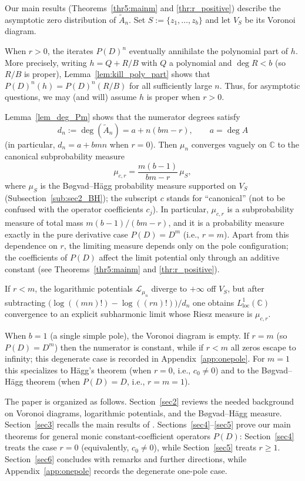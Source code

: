 \documentclass[12pt]{article}
\theoremstyle{plain}
\theoremstyle{definition}
\begin{document}
Our main results (Theorems~\ref{thr5:mainm} and \ref{thr:r_positive}) describe the asymptotic zero distribution of $\widetilde A_n$.
Set $S:=\{z_1,\dots,z_b\}$ and let $V_S$ be its Voronoi diagram.

When $r>0$, the iterates $P(D)^n$ eventually annihilate the polynomial part of $h$.
More precisely, writing $h=Q+R/B$ with $Q$ a polynomial and $\deg R<b$ (so $R/B$ is proper), Lemma~\ref{lem:kill_poly_part} shows that $P(D)^n(h)=P(D)^n(R/B)$ for all sufficiently large $n$.
Thus, for asymptotic questions, we may (and will) assume $h$ is proper when $r>0$.

Lemma~\ref{lem_deg_Pm} shows that the numerator degrees satisfy
$$d_n:=\deg(\widetilde A_n)=a+n(bm-r),\qquad a=\deg A$$
(in particular, $d_n=a+bmn$ when $r=0$).
Then $\mu_n$ converges vaguely on $\mathbb C$ to the canonical subprobability measure
\begin{equation}\label{eq:main_limit_measure}
\mu_{c,r}=\frac{m(b-1)}{bm-r}\,\mu_S,
\end{equation}
where $\mu_S$ is the B\o gvad--H\"agg probability measure supported on $V_S$ (Subsection~\ref{sub:sec2_BH}); the subscript $c$ stands for ``canonical'' (not to be confused with the operator coefficients $c_j$).
In particular, $\mu_{c,r}$ is a subprobability measure of total mass $m(b-1)/(bm-r)$, and it is a probability measure exactly in the pure derivative case $P(D)=D^m$ (i.e., $r=m$).
Apart from this dependence on $r$, the limiting measure depends only on the pole configuration; the coefficients of $P(D)$ affect the limit potential only through an additive constant (see Theorems~\ref{thr5:mainm} and \ref{thr:r_positive}).

If $r<m$, the logarithmic potentials $\mathcal L_{\mu_n}$ diverge to $+\infty$ off $V_S$, but after subtracting $\bigl(\log((mn)!)-\log((rn)!)\bigr)/d_n$ one obtains $L^1_{\mathrm{loc}}(\mathbb C)$ convergence to an explicit subharmonic limit whose Riesz measure is $\mu_{c,r}$.

When $b=1$ (a single simple pole), the Voronoi diagram is empty. If $r=m$ (so $P(D)=D^m$) then the numerator is constant, while if $r<m$ all zeros escape to infinity; this degenerate case is recorded in Appendix~\ref{app:onepole}.
For $m=1$ this specializes to H\"agg's theorem \cite{Hagg} (when $r=0$, i.e., $c_0\neq0$) and to the B\o gvad--H\"agg theorem \cite{B:H} (when $P(D)=D$, i.e., $r=m=1$).

The paper is organized as follows.
Section~\ref{sec2} reviews the needed background on Voronoi diagrams, logarithmic potentials, and the B\o gvad--H\"agg measure.
Section~\ref{sec3} recalls the main results of \cite{B:H,Hagg}.
Sections~\ref{sec4}--\ref{sec5} prove our main theorems for general monic constant-coefficient operators $P(D)$: Section~\ref{sec4} treats the case $r=0$ (equivalently, $c_0\neq0$), while Section~\ref{sec5} treats $r\ge1$.
Section~\ref{sec6} concludes with remarks and further directions, while Appendix~\ref{app:onepole} records the degenerate one-pole case.
\end{document}
